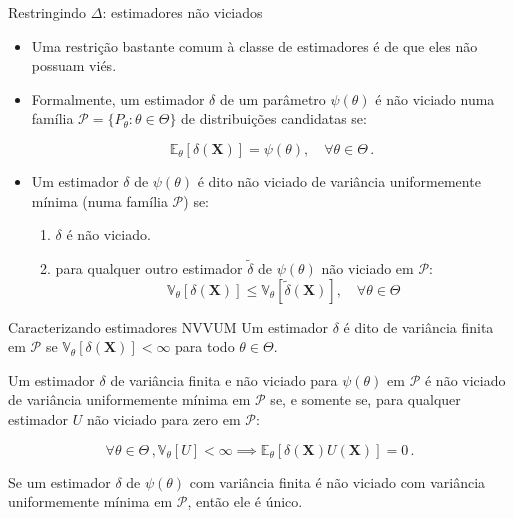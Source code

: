 \documentclass[11pt]{beamer}
\begin{document}
		\begin{frame}{Restringindo $\Delta$: estimadores não viciados}
		\begin{itemize}
			\item Uma restrição bastante comum à classe de estimadores é de que eles não possuam viés.
			\item Formalmente, um estimador $\delta$ de um parâmetro $\psi(\theta)$ é {\color{blue}não viciado} numa família $\mathcal{P} =\{P_\theta: \theta \in \Theta\}$ de distribuições candidatas se:
			
			$$\mathbb{E}_\theta[\delta(\boldsymbol{X})] = \psi(\theta),\quad \forall \theta \in \Theta\, .$$
			\item Um estimador $\delta$ de $\psi(\theta)$ é dito não viciado de variância uniformemente mínima (numa família $\mathcal{P}$) se:
			\begin{enumerate}
				\item $\delta$ é não viciado.
				\item para qualquer outro estimador $\tilde{\delta}$ de $\psi(\theta)$ não viciado em $\mathcal{P}$:
				$$\mathbb{V}_\theta[\delta(\boldsymbol{X})] \leq \mathbb{V}_\theta[\tilde{\delta}(\boldsymbol{X})], \quad \forall \theta \in \Theta$$
			\end{enumerate}			
			
			
			
		\end{itemize}
	\end{frame}
	
		\begin{frame}{Caracterizando estimadores NVVUM}
		Um estimador $\delta$ é dito de variância finita em $\mathcal{P}$ se $\mathbb{V}_\theta[\delta(\boldsymbol{X})] < \infty$ para todo $\theta \in \Theta$. 
		\begin{theorem}
			Um estimador $\delta$ de variância finita e não viciado para  $\psi(\theta)$ em $\mathcal{P}$ é não viciado de variância uniformemente mínima em $\mathcal{P}$ se, e somente se, para qualquer estimador $U$ não viciado para zero em $\mathcal{P}$:
			
			$$\forall \theta \in \Theta\, , \mathbb{V}_\theta[U]<\infty \implies  \mathbb{E}_\theta[\delta(\boldsymbol{X}) U(\boldsymbol{X})] = 0\, .$$
		\end{theorem}
		\begin{corollary}
			Se um estimador $\delta$ de $\psi(\theta)$ com variância finita é não viciado com variância uniformemente mínima em $\mathcal{P}$, então ele é único.
		\end{corollary}
	\end{frame}
	
\end{document}
